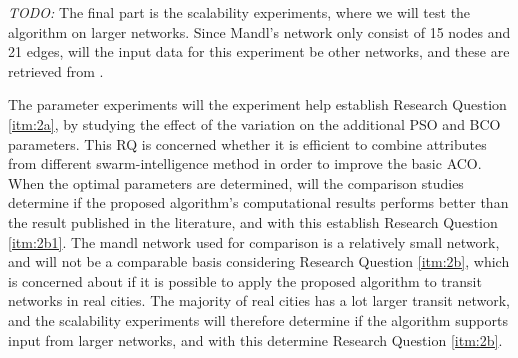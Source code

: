 \emph{\color{blue} TODO: } The final part is the scalability experiments, where we will test the algorithm on larger networks. Since Mandl's network only consist of 15 nodes and 21 edges, will the input data for this experiment be other networks, and these are retrieved from \citet{mumford13}. %

The parameter experiments will the experiment help establish Research Question \vref{itm:2a}, by studying the effect of the variation on the additional PSO and BCO parameters. This RQ is concerned whether it is efficient to combine attributes from different swarm-intelligence method in order to improve the basic ACO. When the optimal parameters are determined, will the comparison studies determine if the proposed algorithm's computational results performs better than the result published in the literature, and with this establish Research Question \vref{itm:2b1}. The mandl network used for comparison is a relatively small network, and will not be a comparable basis considering Research Question \vref{itm:2b}, which is concerned about if it is possible to apply the proposed algorithm to transit networks in real cities. The majority of real cities has a lot larger transit network, and the scalability experiments will therefore determine if the algorithm supports input from larger networks, and with this determine Research Question \vref{itm:2b}.




